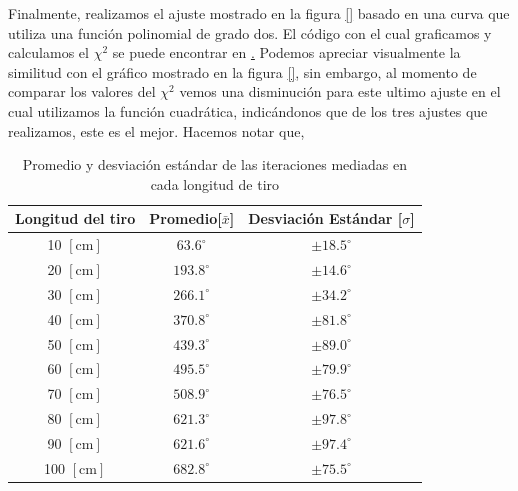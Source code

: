 \documentclass[11pt]{article}
\begin{document}
\medskip

Finalmente, realizamos el ajuste mostrado en la figura \ref{} basado en una curva que utiliza una función polinomial de grado dos. El código con el cual graficamos y calculamos el $\chi^2$ se puede encontrar en \href{}. Podemos apreciar visualmente la similitud con el gráfico mostrado en la figura \ref{}, sin embargo, al momento de comparar los valores del $\chi^2$ vemos una disminución para este ultimo ajuste en el cual utilizamos la función cuadrática, indicándonos que de los tres ajustes que realizamos, este es el mejor. Hacemos notar que, 





\begin{table}[ht]
\centering
\begin{tabular}{|c|c|c|}
\hline
\small{Longitud del tiro} & Promedio[$\bar{x}$]  & Desviación Estándar [$\sigma$]\\ \hline
 10  \scriptsize{$[\text{cm}]$} & $63.6^\circ$  & $\pm 18.5^\circ$  \\ \hline
 20  \scriptsize{$[\text{cm}]$} & $193.8^\circ$ & $\pm 14.6^\circ$  \\ \hline
 30  \scriptsize{$[\text{cm}]$} & $266.1^\circ$ & $\pm 34.2^\circ$  \\ \hline
 40  \scriptsize{$[\text{cm}]$} & $370.8^\circ$ & $\pm 81.8^\circ$  \\ \hline
 50  \scriptsize{$[\text{cm}]$} & $439.3^\circ$ & $\pm 89.0^\circ$  \\ \hline
 60  \scriptsize{$[\text{cm}]$} & $495.5^\circ$ & $\pm 79.9^\circ$  \\ \hline
 70  \scriptsize{$[\text{cm}]$} & $508.9^\circ$ & $\pm 76.5^\circ$  \\ \hline
 80  \scriptsize{$[\text{cm}]$} & $621.3^\circ$ & $\pm 97.8^\circ$  \\ \hline
 90  \scriptsize{$[\text{cm}]$} & $621.6^\circ$ & $\pm 97.4^\circ$  \\ \hline
 100 \scriptsize{$[\text{cm}]$} & $682.8^\circ$ & $\pm 75.5^\circ$  \\ \hline 
\end{tabular}
\caption{Promedio y desviación estándar de las iteraciones mediadas en cada longitud de tiro}
\label{tabla}
\end{table}
\end{document}
